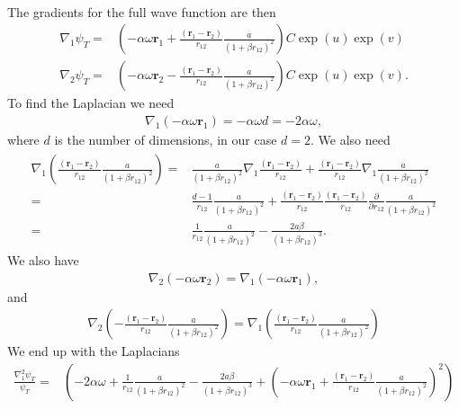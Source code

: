 \documentclass[../main.tex]{subfiles}
\begin{document}
\begin{appendices}
\begin{align}
\end{align}
The gradients for the full wave function are then 
\begin{align}
    \nabla_1 \psi_T =& \left(-\alpha\omega\mathbf{r}_1 + \frac{(\mathbf{r}_1 - \mathbf{r}_2)}{r_{12}} \frac{a}{(1+\beta r_{12})^2}\right)C\exp(u)\exp(v)\\
    \nabla_2 \psi_T =& \left(-\alpha\omega\mathbf{r}_2 - \frac{(\mathbf{r}_1 - \mathbf{r}_2)}{r_{12}} \frac{a}{(1+\beta r_{12})^2}\right)C\exp(u)\exp(v).
\end{align}
To find the Laplacian we need 
\begin{align}
    \nabla_1 (-\alpha\omega\mathbf{r}_1) = -\alpha\omega d = -2\alpha\omega,
\end{align}
where $d$ is the number of dimensions, in our case $d=2$. We also need 
\begin{align}
\begin{split}
    \nabla_1 \left(\frac{(\mathbf{r}_1 - \mathbf{r}_2)}{r_{12}} \frac{a}{(1+\beta r_{12})^2}\right) =& \frac{a}{(1+\beta r_{12})^2}\nabla_1 \frac{(\mathbf{r}_1 - \mathbf{r}_2)}{r_{12}} + \frac{(\mathbf{r}_1 - \mathbf{r}_2)}{r_{12}} \nabla_1 \frac{a}{(1+\beta r_{12})^2}\\
    =& \frac{d-1}{r_{12}}\frac{a}{(1+\beta r_{12})^2} + \frac{(\mathbf{r}_1 - \mathbf{r}_2)}{r_{12}}\frac{(\mathbf{r}_1 - \mathbf{r}_2)}{r_{12}}\frac{\partial}{\partial r_{12}} \frac{a}{(1+\beta r_{12})^2}\\
    =& \frac{1}{r_{12}} \frac{a}{(1+\beta r_{12})^2} - \frac{2a\beta}{(1+\beta r_{12})^3}.
\end{split}
\end{align}
We also have 
\begin{align}
    \nabla_2 (-\alpha\omega\mathbf{r}_2) = \nabla_1 (-\alpha\omega\mathbf{r}_1),
\end{align}
and 
\begin{align}
    \nabla_2 \left(-\frac{(\mathbf{r}_1 - \mathbf{r}_2)}{r_{12}} \frac{a}{(1+\beta r_{12})^2}\right) = \nabla_1 \left(\frac{(\mathbf{r}_1 - \mathbf{r}_2)}{r_{12}} \frac{a}{(1+\beta r_{12})^2}\right)
\end{align}
We end up with the Laplacians 
\begin{align}
    \frac{\nabla_1^2\psi_T}{\psi_T} =& \left(-2\alpha\omega + \frac{1}{r_{12}} \frac{a}{(1+\beta r_{12})^2} - \frac{2a\beta}{(1+\beta r_{12})^3} + \left(-\alpha\omega\mathbf{r}_1 + \frac{(\mathbf{r}_1 - \mathbf{r}_2)}{r_{12}} \frac{a}{(1+\beta r_{12})^2}\right)^2\right)\\

\end{align}
\end{appendices}
\end{document}
